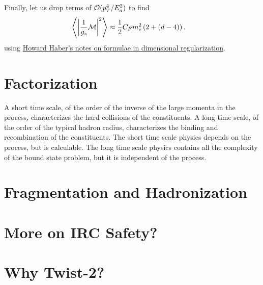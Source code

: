 \begin{subappendices}
Finally, let us drop terms of \(\mathcal{O}(p_T^4/E_a^2)\) to find
\begin{align}
    \left\langle
        \left|\frac{1}{g_s} \mathcal{M} \right|^2
    \right\rangle
    &\approx
    \frac{1}{2}
    C_F m_c^2
    \left(
        2
        +
        (d-4)
    \right)
    .
\end{align}
using \href{http://scipp.ucsc.edu/~haber/ph218/dimreg.pdf}{Howard Haber's notes on formulae in dimensional regularization}.



\section{Factorization}
\epigraph{
    A short time scale, of the order of the inverse of the large momenta in the process, characterizes the hard collisions of the constituents.
    A long time scale, of the order of the typical hadron radius, characterizes the binding and recombination of the constituents.
    The short time scale physics depends on the process, but is calculable.
    The long time scale physics contains all the complexity of the bound state problem, but it is independent of the process.}
    {\Reff{}}


\section{Fragmentation and Hadronization}


\section{More on IRC Safety?}


\section{Why Twist-2?}

\end{subappendices}


